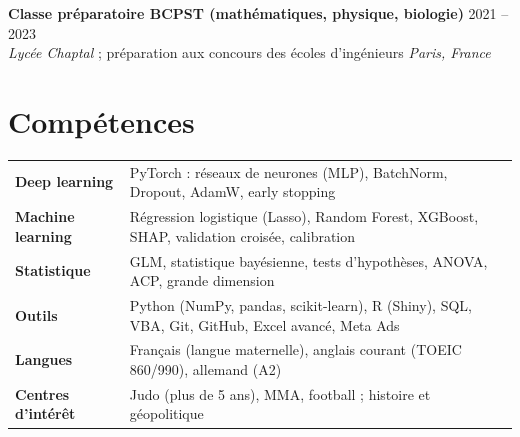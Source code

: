 \documentclass[10pt,a4paper]{article}
\newcommand{\formation}[4]{%
  {\bfseries #1} \hfill {\small\color{soft} #2}\\
  {\small #3} \hfill {\small\itshape\color{soft} #4}\par
  \vspace{2pt}%
}
\begin{document}
\formation{Classe préparatoire BCPST (mathématiques, physique, biologie)}{2021 -- 2023}
          {\textit{Lycée Chaptal} ; préparation aux concours des écoles d'ingénieurs}
          {Paris, France}

\section{Compétences}
\vspace{-2pt}
\renewcommand{\arraystretch}{1.2}
\begin{tabularx}{\linewidth}{@{}>{\bfseries}p{3.2cm}X@{}}
  Deep learning & PyTorch : réseaux de neurones (MLP), BatchNorm, Dropout, AdamW, early stopping \\
  Machine learning & Régression logistique (Lasso), Random Forest, XGBoost, SHAP, validation croisée, calibration \\
  Statistique & GLM, statistique bayésienne, tests d'hypothèses, ANOVA, ACP, grande dimension \\
  Outils & Python (NumPy, pandas, scikit-learn), R (Shiny), SQL, VBA, Git, GitHub, Excel avancé, Meta Ads \\
  Langues & Français (langue maternelle), anglais courant (TOEIC 860/990), allemand (A2) \\
  Centres d'intérêt & Judo (plus de 5 ans), MMA, football ; histoire et géopolitique \\
\end{tabularx}
\end{document}
